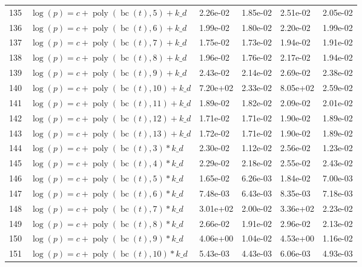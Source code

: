 \documentclass[12pt,a4paper]{article}
\DeclareMathOperator{\bc}{bc}
\DeclareMathOperator{\poly}{poly}
\begin{document}
\begin{longtable}[t]{ll>{\raggedleft\arraybackslash}p{2cm}>{\raggedleft\arraybackslash}p{2cm}>{\raggedleft\arraybackslash}p{2cm}>{\raggedleft\arraybackslash}p{2cm}}
\rowcolor{gray!6}  135 & $\log(p) = c + \poly\left( \bc(t), 5 \right) + k\_d$ & 2.26e-02 & 1.85e-02 & 2.51e-02 & 2.05e-02\\
136 & $\log(p) = c + \poly\left( \bc(t), 6 \right) + k\_d$ & 1.99e-02 & 1.80e-02 & 2.20e-02 & 1.99e-02\\
\rowcolor{gray!6}  137 & $\log(p) = c + \poly\left( \bc(t), 7 \right) + k\_d$ & 1.75e-02 & 1.73e-02 & 1.94e-02 & 1.91e-02\\
138 & $\log(p) = c + \poly\left( \bc(t), 8 \right) + k\_d$ & 1.96e-02 & 1.76e-02 & 2.17e-02 & 1.94e-02\\
\rowcolor{gray!6}  139 & $\log(p) = c + \poly\left( \bc(t), 9 \right) + k\_d$ & 2.43e-02 & 2.14e-02 & 2.69e-02 & 2.38e-02\\
140 & $\log(p) = c + \poly\left( \bc(t), 10 \right) + k\_d$ & 7.20e+02 & 2.33e-02 & 8.05e+02 & 2.59e-02\\
\rowcolor{gray!6}  141 & $\log(p) = c + \poly\left( \bc(t), 11 \right) + k\_d$ & 1.89e-02 & 1.82e-02 & 2.09e-02 & 2.01e-02\\
142 & $\log(p) = c + \poly\left( \bc(t), 12 \right) + k\_d$ & 1.71e-02 & 1.71e-02 & 1.90e-02 & 1.89e-02\\
\rowcolor{gray!6}  143 & $\log(p) = c + \poly\left( \bc(t), 13 \right) + k\_d$ & 1.72e-02 & 1.71e-02 & 1.90e-02 & 1.89e-02\\
144 & $\log(p) = c + \poly\left( \bc(t), 3 \right) * k\_d$ & 2.30e-02 & 1.12e-02 & 2.56e-02 & 1.23e-02\\
\rowcolor{gray!6}  145 & $\log(p) = c + \poly\left( \bc(t), 4 \right) * k\_d$ & 2.29e-02 & 2.18e-02 & 2.55e-02 & 2.43e-02\\
146 & $\log(p) = c + \poly\left( \bc(t), 5 \right) * k\_d$ & 1.65e-02 & 6.26e-03 & 1.84e-02 & 7.00e-03\\
\rowcolor{gray!6}  147 & $\log(p) = c + \poly\left( \bc(t), 6 \right) * k\_d$ & 7.48e-03 & 6.43e-03 & 8.35e-03 & 7.18e-03\\
148 & $\log(p) = c + \poly\left( \bc(t), 7 \right) * k\_d$ & 3.01e+02 & 2.00e-02 & 3.36e+02 & 2.23e-02\\
\rowcolor{gray!6}  149 & $\log(p) = c + \poly\left( \bc(t), 8 \right) * k\_d$ & 2.66e-02 & 1.91e-02 & 2.96e-02 & 2.13e-02\\
150 & $\log(p) = c + \poly\left( \bc(t), 9 \right) * k\_d$ & 4.06e+00 & 1.04e-02 & 4.53e+00 & 1.16e-02\\
\rowcolor{gray!6}  151 & $\log(p) = c + \poly\left( \bc(t), 10 \right) * k\_d$ & 5.43e-03 & 4.43e-03 & 6.06e-03 & 4.93e-03\\

\end{longtable}
\end{document}
